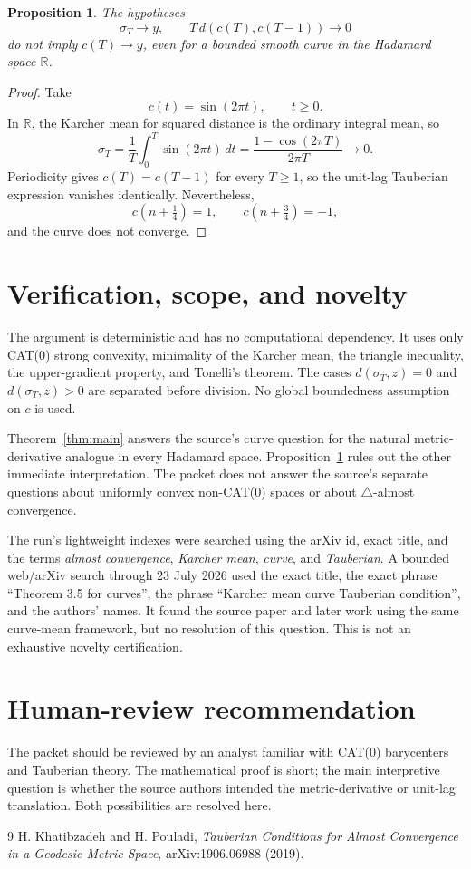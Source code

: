 \documentclass[11pt]{article}
\newtheorem{proposition}{Proposition}
\newcommand{\R}{\mathbb R}
\begin{document}
\begin{proposition}\label{prop:counterexample}
The hypotheses
\[
 \sigma_T\longrightarrow y,
 \qquad
 T\,d(c(T),c(T-1))\longrightarrow0
\]
do not imply $c(T)\to y$, even for a bounded smooth curve in the Hadamard
space $\R$.
\end{proposition}

\begin{proof}
Take
\[
 c(t)=\sin(2\pi t),\qquad t\geq0.
\]
In $\R$, the Karcher mean for squared distance is the ordinary integral
mean, so
\[
 \sigma_T=\frac1T\int_0^T\sin(2\pi t)\,dt
 =\frac{1-\cos(2\pi T)}{2\pi T}\longrightarrow0.
\]
Periodicity gives $c(T)=c(T-1)$ for every $T\geq1$, so the unit-lag
Tauberian expression vanishes identically.  Nevertheless,
\[
 c(n+\tfrac14)=1,\qquad c(n+\tfrac34)=-1,
\]
and the curve does not converge.
\end{proof}

\section{Verification, scope, and novelty}

The argument is deterministic and has no computational dependency.  It uses
only CAT(0) strong convexity, minimality of the Karcher mean, the triangle
inequality, the upper-gradient property, and Tonelli's theorem.  The cases
$d(\sigma_T,z)=0$ and $d(\sigma_T,z)>0$ are separated before division.
No global boundedness assumption on $c$ is used.

Theorem~\ref{thm:main} answers the source's curve question for the natural
metric-derivative analogue in every Hadamard space.
Proposition~\ref{prop:counterexample} rules out the other immediate
interpretation.  The packet does not answer the source's separate questions
about uniformly convex non-CAT(0) spaces or about $\triangle$-almost
convergence.

The run's lightweight indexes were searched using the arXiv id, exact title,
and the terms \emph{almost convergence}, \emph{Karcher mean},
\emph{curve}, and \emph{Tauberian}.  A bounded web/arXiv search through
23 July 2026 used the exact title, the exact phrase ``Theorem 3.5 for
curves'', the phrase ``Karcher mean curve Tauberian condition'', and the
authors' names.  It found the source paper and later work using the same
curve-mean framework, but no resolution of this question.  This is not an
exhaustive novelty certification.

\section{Human-review recommendation}

The packet should be reviewed by an analyst familiar with CAT(0)
barycenters and Tauberian theory.  The mathematical proof is short; the main
interpretive question is whether the source authors intended the
metric-derivative or unit-lag translation.  Both possibilities are resolved
here.

\begin{thebibliography}{9}
H. Khatibzadeh and H. Pouladi,
\emph{Tauberian Conditions for Almost Convergence in a Geodesic Metric
Space}, arXiv:1906.06988 (2019).
\end{thebibliography}
\end{document}
